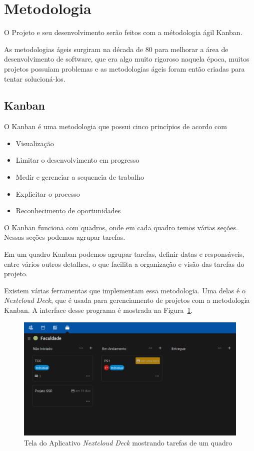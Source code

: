 \documentclass[12pt]{article}
\begin{document}
\section{Metodologia}

O Projeto e seu desenvolvimento serão feitos com a métodologia ágil Kanban.

As metodologias ágeis surgiram na década de 80 para melhorar a área de desenvolvimento de software,
que era algo muito rigoroso naquela época, muitos projetos possuiam problemas e as metodologias ágeis foram então
criadas para tentar solucioná-los.~\cite{Santos05}

\subsection{Kanban}

O Kanban é uma metodologia que possui cinco princípios de acordo com~\cite{Agile06}
\begin{itemize}
  \item Visualização
  \item Limitar o desenvolvimento em progresso
  \item Medir e gerenciar a sequencia de trabalho
  \item Explicitar o processo
  \item Reconhecimento de oportunidades
\end{itemize}

O Kanban funciona com quadros, onde em cada quadro temos várias seções.
Nessas seções podemos agrupar tarefas.

Em um quadro Kanban podemos agrupar tarefas, definir datas e responsáveis, entre vários outros
detalhes, o que facilita a organização e visão das tarefas do projeto.

Existem várias ferramentas que implementam essa metodologia.
Uma delas é o \emph{Nextcloud Deck}, que é usada para gerenciamento de projetos
com a metodologia Kanban. A interface desse programa é mostrada na Figura~\ref{fig:nexcloud-deck}.

\begin{figure}[H]
  \centering
  \includegraphics[width=.8\textwidth]{fig1.png}
  \caption{Tela do Aplicativo \emph{Nextcloud Deck} mostrando tarefas de um quadro}\label{fig:nexcloud-deck}
\end{figure}
\end{document}
